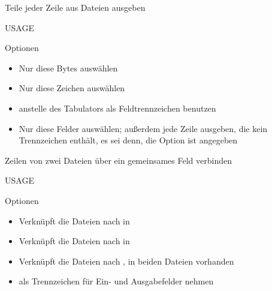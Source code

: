 \documentclass[aspectratio=43]{beamer}
\begin{document}
\begin{frame} 
	\begin{block}{} 
       Teile jeder Zeile aus Dateien ausgeben
	\end{block}
	\begin{block}{USAGE} 
	\end{block}
	\begin{exampleblock}{Optionen} 
	\begin{itemize}
	\item {} Nur diese Bytes auswählen
	\item {} Nur diese Zeichen auswählen
	\item {}  anstelle des Tabulators als Feldtrennzeichen benutzen
	\item {} Nur  diese  Felder  auswählen; außerdem jede Zeile ausgeben, die kein Trennzeichen enthält,  es  sei  denn,  die  Option    ist angegeben
	\end{itemize}
	\end{exampleblock}
\end{frame}

\begin{frame} 
	\begin{block}{} 
        Zeilen von zwei Dateien über ein gemeinsames Feld verbinden
	\end{block}
	\begin{block}{USAGE} 
	\end{block}
	\begin{exampleblock}{Optionen} 
	\begin{itemize}
	\item {} Verknüpft die Dateien nach  in 
	\item {} Verknüpft die Dateien nach  in 
	\item {} Verknüpft die Dateien nach , in beiden Dateien vorhanden
	\item {}   als Trennzeichen für Ein- und Ausgabefelder nehmen
	\end{itemize}
	\end{exampleblock}
\end{frame}
\end{document}
